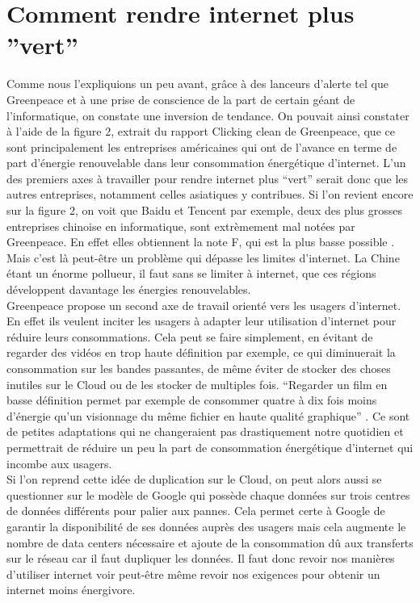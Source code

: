 \documentclass[a4paper,twocolumn,12pt]{article}
\begin{document}
\section{Comment rendre internet plus ''vert''}

	Comme nous l’expliquions un peu avant, grâce à des lanceurs d’alerte tel que Greenpeace et à une prise de conscience de la part de certain géant de l’informatique, on constate une inversion de tendance. On pouvait ainsi constater à l’aide de la figure 2, extrait du rapport Clicking clean de Greenpeace, que ce sont principalement les entreprises américaines qui ont de l’avance en terme de part d’énergie renouvelable dans leur consommation énergétique d’internet. L’un des premiers axes à travailler pour rendre internet plus “vert” serait donc que les autres entreprises, notamment celles asiatiques y contribues. Si l’on revient encore sur la figure 2, on voit que Baidu et Tencent par exemple, deux des plus grosses entreprises chinoise en informatique, sont extrèmement mal notées par Greenpeace. En effet elles obtiennent la note F, qui est la plus basse possible \cite{3}. Mais c’est là peut-être un problème qui dépasse les limites d’internet. La Chine étant un énorme pollueur, il faut sans se limiter à internet, que ces régions développent davantage les énergies renouvelables. \\

	Greenpeace propose un second axe de travail orienté vers les usagers d’internet. En effet ils veulent inciter les usagers à adapter leur utilisation d’internet pour réduire leurs consommations. Cela peut se faire simplement, en évitant de regarder des vidéos en trop haute définition par exemple, ce qui diminuerait la consommation sur les bandes passantes, de même éviter de stocker des choses inutiles sur le Cloud ou de les stocker de multiples fois. “Regarder un film en basse définition permet par exemple de consommer quatre à dix fois moins d’énergie qu’un visionnage du même fichier en haute qualité graphique” \cite{3}. Ce sont de petites adaptations qui ne changeraient pas drastiquement notre quotidien et permettrait de réduire un peu la part de consommation énergétique d’internet qui incombe aux usagers. \\
	
	Si l’on reprend cette idée de duplication sur le Cloud, on peut alors aussi se questionner sur le modèle de Google qui possède chaque données sur trois centres de données différents pour palier aux pannes. Cela permet certe à Google de garantir la disponibilité de ses données auprès des usagers mais cela augmente le nombre de data centers nécessaire et ajoute de la consommation dû aux transferts sur le réseau car il faut dupliquer les données. Il faut donc revoir nos manières d’utiliser internet voir peut-être même revoir nos exigences pour obtenir un internet moins énergivore. \\
\end{document}
